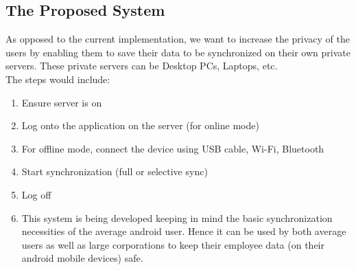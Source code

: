 \subsection{The Proposed System}
\hspace*{0.82cm}As opposed to the current implementation, we want to increase the privacy of the
users by enabling them to save their data to be synchronized on their own private servers.
These private servers can be Desktop PCs, Laptops, etc.\\[0.5cm]
The steps would include:
\begin{enumerate}
 \item Ensure server is on
 \item Log onto the application on the server (for online mode)
 \item For offline mode, connect the device using USB cable, Wi-Fi, Bluetooth
 \item Start synchronization (full or selective sync)
 \item Log off
 \item This system is being developed keeping in mind the basic synchronization
necessities of the average android user. Hence it can be used by both average
users as well as large corporations to keep their employee data (on their android
mobile devices) safe.
\end{enumerate}